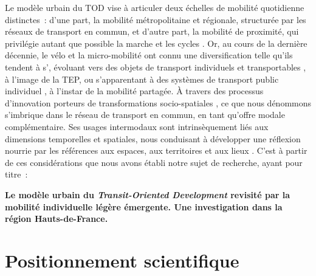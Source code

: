 \begin{refsegment}
Le modèle urbain du \acrshort{TOD} vise à articuler deux échelles de mobilité quotidienne distinctes~: d’une part, la mobilité métropolitaine et régionale, structurée par les réseaux de transport en commun, et d’autre part, la mobilité de proximité, qui privilégie autant que possible la marche et les cycles \textcolor{blue}{\autocites[81]{conesa_modelisation_2010}[124]{lo_feudo_scenario_2014}}. Or, au cours de la dernière décennie, le vélo et la micro-mobilité ont connu une diversification telle qu'ils tendent à s', évoluant vers des objets de transport individuels et transportables \textcolor{blue}{\autocite[20]{amar_du_2012}}, à l'image de la \acrfull{TEP}, ou s'apparentant à des systèmes de transport public individuel \textcolor{blue}{\autocites[179]{amar_homo_2010}[4]{castex_prise_2017}}, à l'instar de la mobilité partagée. À travers des processus d’innovation porteurs de transformations socio-spatiales \textcolor{blue}{\autocite[89]{ageron_intermodalite-voyageurs_2013}}, ce que nous dénommons  s'imbrique dans le réseau de transport en commun, en tant qu'offre modale complémentaire. Ses usages intermodaux sont intrinsèquement liés aux dimensions temporelles et spatiales, nous conduisant à développer une réflexion nourrie par les références aux espaces, aux territoires et aux lieux \textcolor{blue}{\autocite[4]{sebban_complementarite_2003}}. C’est à partir de ces considérations que nous avons établi notre sujet de recherche, ayant pour titre~:
    \begin{displayquote}
\textbf{Le modèle urbain du \textsl{Transit-Oriented Development} revisité par la mobilité individuelle légère émergente. Une investigation dans la région Hauts-de-France.}
    \end{displayquote}%

\section*{Positionnement scientifique
    \label{introduction-generale:positionnement-scientifique}
    }


\end{refsegment}
